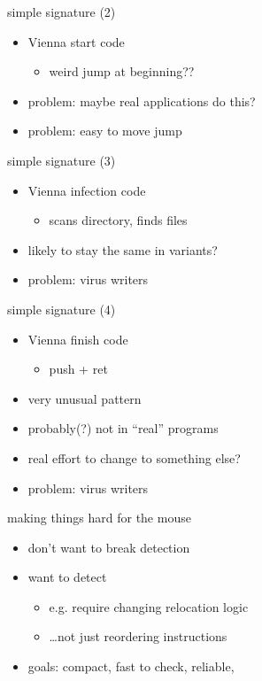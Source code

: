 \begin{frame}{simple signature (2)}
    \begin{itemize}
    \item Vienna start code
        \begin{itemize}
        \item weird jump at beginning??
        \end{itemize}
    \item problem: maybe real applications do this?
    \item problem: easy to move jump
    \end{itemize}
\end{frame}

\begin{frame}{simple signature (3)}
    \begin{itemize}
    \item Vienna infection code
        \begin{itemize}
        \item scans directory, finds files
        \end{itemize}
    \item likely to stay the same in variants?
    \item<2> problem: virus writers 
    \end{itemize}
\end{frame}

\begin{frame}{simple signature (4)}
    \begin{itemize}
    \item Vienna finish code
        \begin{itemize}
        \item push + ret 
        \end{itemize}
    \item very unusual pattern
    \item probably(?) not in ``real'' programs
    \item real effort to change to something else?
    \item<2> problem: virus writers 
    \end{itemize}
\end{frame}


\begin{frame}{making things hard for the mouse}
    \begin{itemize}
    \item don't want  to break detection
    \item want to detect 
        \begin{itemize}
        \item e.g. require changing relocation logic
        \item \ldots not just reordering instructions
        \end{itemize}
    \item goals: compact, fast to check, reliable, 
    \end{itemize}
\end{frame}

